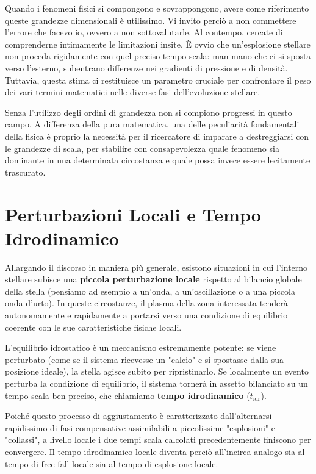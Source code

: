 Quando i fenomeni fisici si compongono e sovrappongono, avere come riferimento queste grandezze dimensionali è utilissimo. Vi invito perciò a non commettere l'errore che facevo io, ovvero a non sottovalutarle. Al contempo, cercate di comprenderne intimamente le limitazioni insite. È ovvio che un'esplosione stellare non proceda rigidamente con quel preciso tempo scala: man mano che ci si sposta verso l'esterno, subentrano differenze nei gradienti di pressione e di densità. Tuttavia, questa stima ci restituisce un parametro cruciale per confrontare il peso dei vari termini matematici nelle diverse fasi dell'evoluzione stellare.

Senza l'utilizzo degli ordini di grandezza non si compiono progressi in questo campo. A differenza della pura matematica, una delle peculiarità fondamentali della fisica è proprio la necessità per il ricercatore di imparare a destreggiarsi con le grandezze di scala, per stabilire con consapevolezza quale fenomeno sia dominante in una determinata circostanza e quale possa invece essere lecitamente trascurato.

\section{Perturbazioni Locali e Tempo Idrodinamico}
Allargando il discorso in maniera più generale, esistono situazioni in cui l'interno stellare subisce una \textbf{piccola perturbazione locale} rispetto al bilancio globale della stella (pensiamo ad esempio a un'onda, a un'oscillazione o a una piccola onda d'urto).
In queste circostanze, il plasma della zona interessata tenderà autonomamente e rapidamente a portarsi verso una condizione di equilibrio coerente con le sue caratteristiche fisiche locali.

L'equilibrio idrostatico è un meccanismo estremamente potente: se viene perturbato (come se il sistema ricevesse un "calcio" e si spostasse dalla sua posizione ideale), la stella agisce subito per ripristinarlo. Se localmente un evento perturba la condizione di equilibrio, il sistema tornerà in assetto bilanciato su un tempo scala ben preciso, che chiamiamo \textbf{tempo idrodinamico} ($t_{\text{idr}}$).

Poiché questo processo di aggiustamento è caratterizzato dall'alternarsi rapidissimo di fasi compensative assimilabili a piccolissime "esplosioni" e "collassi", a livello locale i due tempi scala calcolati precedentemente finiscono per convergere. Il tempo idrodinamico locale diventa perciò all'incirca analogo sia al tempo di free-fall locale sia al tempo di esplosione locale.

